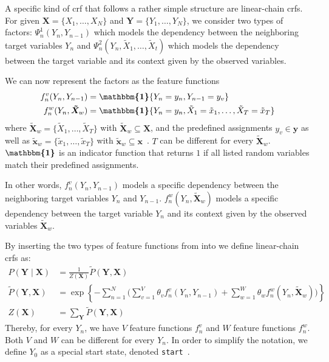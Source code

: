 A specific kind of \gls{crf} that follows a rather simple structure are \glspl{linear-chain crf}.
For given $\bm{X}=\{X_1,\dots,X_N\}$ and $\bm{Y}=\{Y_1,\dots,Y_N\}$, we consider two types of \glspl{factor}: $\Psi_n^1(Y_n,Y_{n-1})$ which models the dependency between the neighboring \glspl{target variable} $Y_n$ and $\Psi_n^2(Y_n,\tilde{X}_1,\dots,\tilde{X}_t)$ which models the dependency between the \gls{target variable} and its context given by the \glspl{observed variable}.

We can now represent the \glspl{factor} as the \glspl{feature function}
\begin{equation}
  \label{equ:linear-chain-crf-feature-functions}
  \begin{split}
   f_n^v(Y_n,Y_{n-1}) & = \bm{\mathbbm{1}}\{Y_n=y_n,Y_{n-1}=y_v\}\\
   f_n^w(Y_n,\bm{\tilde{X}}_w) & = \bm{\mathbbm{1}}\{Y_n=y_n,\tilde{X}_1=\tilde{x}_1,\dots,\tilde{X}_T=\tilde{x}_T\}
  \end{split}
\end{equation}
where $\bm{\tilde{X}}_w=\{\tilde{X}_1,\dots,\tilde{X}_T\}$ with $\bm{\tilde{X}}_w\subseteq \bm{X}$, and the predefined assignments $y_v\in\bm{y}$ as well as $\bm{\tilde{x}}_w=\{\tilde{x}_1,\dots,\tilde{x}_T\}$ with $\bm{\tilde{x}}_w\subseteq\bm{x}$~\citep{koller2009probabilistic}.
$T$ can be different for every $\bm{\tilde{X}}_w$.
$\bm{\mathbbm{1}}$ is an indicator function that returns $1$ if all listed \glspl{random variable} match their predefined assignments.

In other words, $f_n^v(Y_n,Y_{n-1})$ models a specific dependency between the neighboring \glspl{target variable} $Y_n$ and $Y_{n-1}$. $f_n^w(Y_n,\bm{\tilde{X}}_w)$ models a specific dependency between the \gls{target variable} $Y_n$ and its context given by the \glspl{observed variable} $\bm{\tilde{X}}_w$.

By inserting the two types of \glspl{feature function} from  into  we define \glspl{linear-chain crf} as:
\begin{equation}
  \label{equ:linear-chain-crf}
  \begin{split}
    P(\bm{Y}\mid\bm{X}) & = \frac{1}{Z(\bm{X})}\tilde{P}(\bm{Y},\bm{X})  \\
    \tilde{P}(\bm{Y},\bm{X}) & = \exp\left\{ -\sum_{n=1}^N \Big(\sum_{v=1}^V\theta_v f_n^v(Y_n,Y_{n-1})+\sum_{w=1}^W\theta_w f_n^w(Y_n,\bm{\tilde{X}}_w)\Big) \right\} \\
    Z(\bm{X}) & = \sum_{\bm{Y}}\tilde{P}(\bm{Y},\bm{X})
  \end{split}
\end{equation}
Thereby, for every $Y_n$, we have $V$ \glspl{feature function} $f_n^v$ and $W$ \glspl{feature function} $f_n^w$.
Both $V$ and $W$ can be different for every $Y_n$.
In order to simplify the notation, we define $Y_0$ as a special start state, denoted \texttt{start}~\citep{lafferty2001conditional}.


